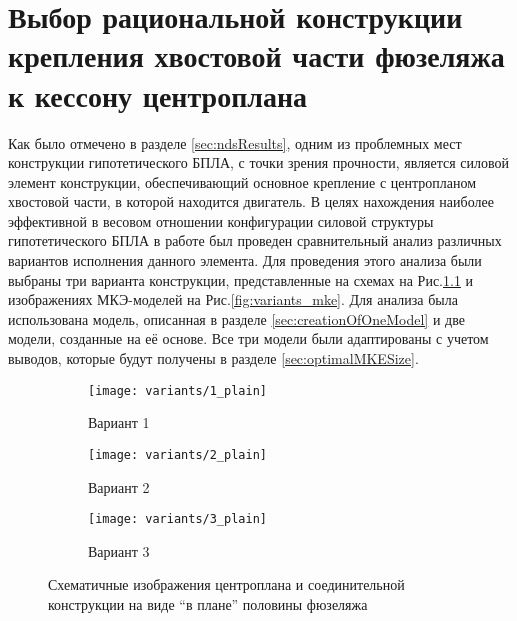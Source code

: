  
\chapter{Выбор рациональной конструкции крепления хвостовой части фюзеляжа к кессону центроплана}
Как было отмечено в разделе \ref{sec:ndsResults}, одним из проблемных мест конструкции гипотетического БПЛА, с точки зрения прочности, является силовой элемент конструкции, обеспечивающий основное крепление с центропланом хвостовой части, в которой находится двигатель. В целях нахождения наиболее эффективной в весовом отношении конфигурации силовой структуры гипотетического БПЛА в работе был проведен сравнительный анализ различных вариантов исполнения данного элемента. Для проведения этого анализа были выбраны три варианта конструкции, представленные на схемах на Рис.\ref{fig:variants_plain} и изображениях МКЭ-моделей на Рис.\ref{fig:variants_mke}. Для анализа была использована модель, описанная в разделе \ref{sec:creationOfOneModel} и две модели, созданные на её основе. Все три модели были адаптированы с учетом выводов, которые будут получены в разделе \ref{sec:optimalMKESize}.  

\begin{figure}[H]
\centering
\captionsetup{justification=centering}
\begin{subfigure}[b]{0.32\textwidth}
\centering
	\texttt{[image: variants/1\_plain]}
	\caption{Вариант 1}
\end{subfigure}
\hspace{\fill}
\begin{subfigure}[b]{0.32\textwidth}
\centering
	\texttt{[image: variants/2\_plain]}
	\caption{Вариант 2}
\end{subfigure}
\hspace{\fill}
\begin{subfigure}[b]{0.32\textwidth}
\centering
	\texttt{[image: variants/3\_plain]}
	\caption{Вариант 3}
\end{subfigure}
\hspace{\fill}
\caption{Схематичные изображения центроплана и соединительной конструкции на виде ``в плане'' половины фюзеляжа }
\label{fig:variants_plain}
\end{figure}	


